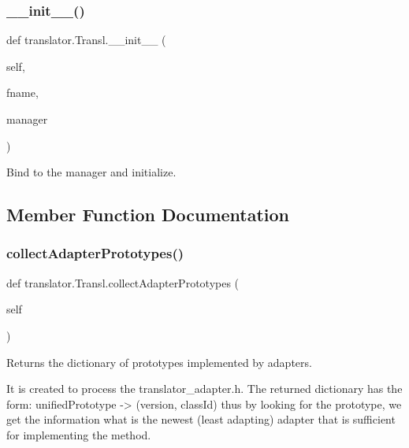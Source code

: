 \subsubsection{\texorpdfstring{\_\_init\_\_()}{\_\_init\_\_()}}
{\footnotesize\ttfamily def translator.\+Transl.\+\_\+\+\_\+init\+\_\+\+\_\+ (\begin{DoxyParamCaption}\item[{}]{self,  }\item[{}]{fname,  }\item[{}]{manager }\end{DoxyParamCaption})}

\begin{DoxyVerb}Bind to the manager and initialize.\end{DoxyVerb}
 

\subsection{Member Function Documentation}
\mbox{\label{classtranslator_1_1_transl_a0aa3555a3d4ff434bd54af94c922159a}} 
\subsubsection{\texorpdfstring{collectAdapterPrototypes()}{collectAdapterPrototypes()}}
{\footnotesize\ttfamily def translator.\+Transl.\+collect\+Adapter\+Prototypes (\begin{DoxyParamCaption}\item[{}]{self }\end{DoxyParamCaption})}

\begin{DoxyVerb}Returns the dictionary of prototypes implemented by adapters.

It is created to process the translator_adapter.h. The returned
dictionary has the form: unifiedPrototype -> (version, classId)
thus by looking for the prototype, we get the information what is
the newest (least adapting) adapter that is sufficient for
implementing the method.\end{DoxyVerb}
 \mbox{\label{classtranslator_1_1_transl_a9a11ebef292c720a8dada81e409df3bd}} 
